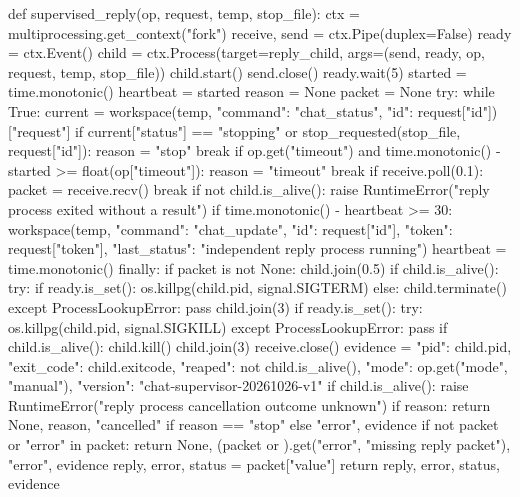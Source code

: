 def supervised_reply(op, request, temp, stop_file):
    ctx = multiprocessing.get_context("fork")
    receive, send = ctx.Pipe(duplex=False)
    ready = ctx.Event()
    child = ctx.Process(target=reply_child,
                        args=(send, ready, op, request, temp, stop_file))
    child.start()
    send.close()
    ready.wait(5)
    started = time.monotonic()
    heartbeat = started
    reason = None
    packet = None
    try:
        while True:
            current = workspace(temp, {"command": "chat_status", "id": request["id"]})["request"]
            if current["status"] == "stopping" or stop_requested(stop_file, request["id"]):
                reason = "stop"
                break
            if op.get("timeout") and time.monotonic() - started >= float(op["timeout"]):
                reason = "timeout"
                break
            if receive.poll(0.1):
                packet = receive.recv()
                break
            if not child.is_alive():
                raise RuntimeError("reply process exited without a result")
            if time.monotonic() - heartbeat >= 30:
                workspace(temp, {"command": "chat_update", "id": request["id"],
                                  "token": request["token"],
                                  "last_status": "independent reply process running"})
                heartbeat = time.monotonic()
    finally:
        if packet is not None:
            child.join(0.5)
        if child.is_alive():
            try:
                if ready.is_set():
                    os.killpg(child.pid, signal.SIGTERM)
                else:
                    child.terminate()
            except ProcessLookupError:
                pass
        child.join(3)
        if ready.is_set():
            try:
                os.killpg(child.pid, signal.SIGKILL)
            except ProcessLookupError:
                pass
        if child.is_alive():
            child.kill()
        child.join(3)
        receive.close()
    evidence = {"pid": child.pid, "exit_code": child.exitcode,
                "reaped": not child.is_alive(), "mode": op.get("mode", "manual"),
                "version": "chat-supervisor-20261026-v1"}
    if child.is_alive():
        raise RuntimeError("reply process cancellation outcome unknown")
    if reason:
        return None, reason, "cancelled" if reason == "stop" else "error", evidence
    if not packet or "error" in packet:
        return None, (packet or {}).get("error", "missing reply packet"), "error", evidence
    reply, error, status = packet["value"]
    return reply, error, status, evidence


